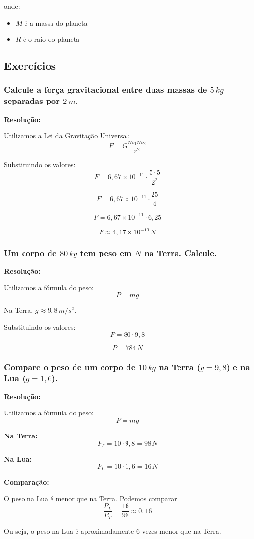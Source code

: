 \documentclass[a4paper,12pt]{article}
\begin{document}
onde:
\begin{itemize}
    \item $M$ é a massa do planeta
    \item $R$ é o raio do planeta
\end{itemize}

\subsection{Exercícios}

\subsubsection{Calcule a força gravitacional entre duas massas de $5\,kg$ separadas por $2\,m$.}
{\color{blue}
\textbf{Resolução:}

Utilizamos a Lei da Gravitação Universal:
\[
F = G \frac{m_1 m_2}{r^2}
\]

Substituindo os valores:
\[
F = 6{,}67 \times 10^{-11} \cdot \frac{5 \cdot 5}{2^2}
\]

\[
F = 6{,}67 \times 10^{-11} \cdot \frac{25}{4}
\]

\[
F = 6{,}67 \times 10^{-11} \cdot 6{,}25
\]

\[
F \approx 4{,}17 \times 10^{-10}\,N
\]

}
\newpage

\subsubsection{Um corpo de $80\,kg$ tem peso em $N$ na Terra. Calcule.}
{\color{blue}
\textbf{Resolução:}

Utilizamos a fórmula do peso:
\[
P = m g
\]

Na Terra, $g \approx 9{,}8\,m/s^2$.

Substituindo os valores:
\[
P = 80 \cdot 9{,}8
\]

\[
P = 784\,N
\]

}
\newpage

\subsubsection{Compare o peso de um corpo de $10\,kg$ na Terra ($g=9{,}8$) e na Lua ($g=1{,}6$).}
{\color{blue}
\textbf{Resolução:}

Utilizamos a fórmula do peso:
\[
P = m g
\]

\textbf{Na Terra:}
\[
P_T = 10 \cdot 9{,}8 = 98\,N
\]

\textbf{Na Lua:}
\[
P_L = 10 \cdot 1{,}6 = 16\,N
\]

\textbf{Comparação:}

O peso na Lua é menor que na Terra. Podemos comparar:
\[
\frac{P_L}{P_T} = \frac{16}{98} \approx 0{,}16
\]

Ou seja, o peso na Lua é aproximadamente $6$ vezes menor que na Terra.

}
\newpage
\end{document}

